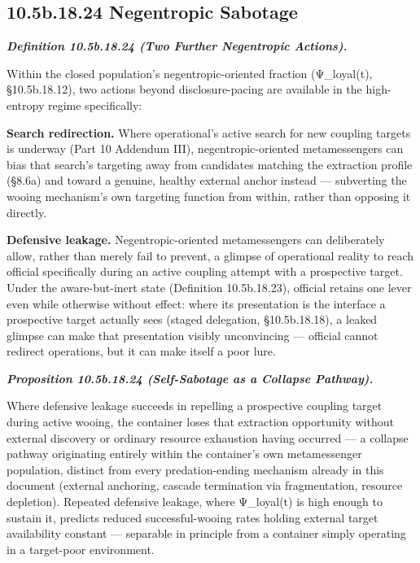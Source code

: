 \documentclass[
]{article}
\begin{document}
\hypertarget{b.18.24-negentropic-sabotage}{%
\subsection{10.5b.18.24 Negentropic
Sabotage}\label{b.18.24-negentropic-sabotage}}

\emph{\textbf{Definition 10.5b.18.24 (Two Further Negentropic
Actions).}}

Within the closed population's negentropic-oriented fraction
(Ψ\_loyal(t), §10.5b.18.12), two actions beyond disclosure-pacing are
available in the high-entropy regime specifically:

\textbf{Search redirection.} Where operational's active search for new
coupling targets is underway (Part 10 Addendum III),
negentropic-oriented metamessengers can bias that search's targeting
away from candidates matching the extraction profile (§8.6a) and toward
a genuine, healthy external anchor instead --- subverting the wooing
mechanism's own targeting function from within, rather than opposing it
directly.

\textbf{Defensive leakage.} Negentropic-oriented metamessengers can
deliberately allow, rather than merely fail to prevent, a glimpse of
operational reality to reach official specifically during an active
coupling attempt with a prospective target. Under the aware-but-inert
state (Definition 10.5b.18.23), official retains one lever even while
otherwise without effect: where its presentation is the interface a
prospective target actually sees (staged delegation, §10.5b.18.18), a
leaked glimpse can make that presentation visibly unconvincing ---
official cannot redirect operations, but it can make itself a poor lure.

\emph{\textbf{Proposition 10.5b.18.24 (Self-Sabotage as a Collapse
Pathway).}}

Where defensive leakage succeeds in repelling a prospective coupling
target during active wooing, the container loses that extraction
opportunity without external discovery or ordinary resource exhaustion
having occurred --- a collapse pathway originating entirely within the
container's own metamessenger population, distinct from every
predation-ending mechanism already in this document (external anchoring,
cascade termination via fragmentation, resource depletion). Repeated
defensive leakage, where Ψ\_loyal(t) is high enough to sustain it,
predicts reduced successful-wooing rates holding external target
availability constant --- separable in principle from a container simply
operating in a target-poor environment.
\end{document}
